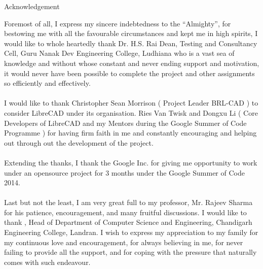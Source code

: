 \begin{center}
\huge{Acknowledgement}
\end{center}
Foremost of all, I express my sincere indebtedness to the “Almighty”, for bestowing me with all the favourable circumstances and kept me in high spirits, I would like to whole heartedly thank Dr. H.S. Rai Dean, Testing and Consultancy Cell, Guru Nanak Dev Engineering College, Ludhiana who is a vast sea of knowledge and without whose constant and never ending support and motivation, it would never have been possible to complete the project and other assignments so efficiently and effectively.\\\\
I would like to thank Christopher Sean Morrison ( Project Leader BRL-CAD ) to consider LibreCAD under its organisation. Ries Van Twisk and Dongxu Li ( Core Developers of LibreCAD and my Mentors during the Google Summer of Code Programme ) for having firm faith in me and constantly encouraging and helping out through out the development of the project.\\\\
Extending the thanks, I thank the Google Inc. for giving me opportunity to work under an opensource project for 3 months under the Google Summer of Code 2014.\\\\
Last but not the least, I am very great full to my professor, Mr. Rajeev Sharma for his patience, encouragement, and many fruitful discussions. I would like to thank , Head of Department of Computer Science and Engineering, Chandigarh Engineering College, Landran. I wish to express my appreciation to my family for my continuous love and encouragement, for always believing in me, for never failing to provide all the support, and for coping with the pressure that naturally comes with such endeavour.\\\\
